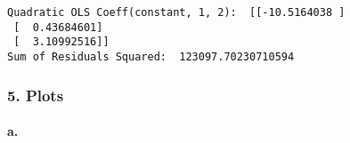 \documentclass[11pt]{article}
\begin{document}
    \begin{Verbatim}[commandchars=\\\{\}]
Quadratic OLS Coeff(constant, 1, 2):  [[-10.5164038 ]
 [  0.43684601]
 [  3.10992516]]
Sum of Residuals Squared:  123097.70230710594
    \end{Verbatim}

    \hypertarget{plots}{%
\subsubsection{5. Plots}\label{plots}}

\hypertarget{a.}{%
\paragraph{a.}\label{a.}}
\end{document}
